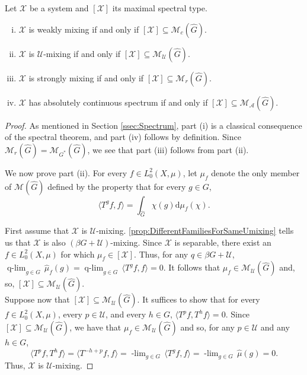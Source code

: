 \documentclass[graybox]{svmult}
\theoremstyle{definition}
\newcommand{\plimgG}[3]{\mathop {#1\text{-lim}}_{#2\in #3}\,}
\begin{document}
\begin{theorem}\label{thm:}
   Let $\mathcal{X}$ be a system and $[\mathcal{X}]$ its maximal spectral type.
    \begin{enumerate}[(i)]
        \item $\mathcal{X}$ is weakly mixing if and only if  $[\mathcal{X}] \subseteq \mathcal{M}_c(\widehat{G})$.

        \item $\mathcal{X}$ is $\mathcal{U}$-mixing if and only if  $[\mathcal{X}] \subseteq \mathcal{M}_\mathcal{U}(\widehat{G})$.

        \item $\mathcal{X}$ is strongly mixing if and only if  $[\mathcal{X}] \subseteq \mathcal{M}_r(\widehat{G})$.

        \item $\mathcal{X}$ has absolutely continuous spectrum if and only if  $[\mathcal{X}] \subseteq \mathcal{M}_\mathcal{A}(\widehat{G})$.
    \end{enumerate}
\end{theorem}
\begin{proof}
    As mentioned in Section \ref{ssec:Spectrum}, part (i) is a classical consequence of the spectral theorem, and part (iv) follows by definition.
    Since $\mathcal{M}_r(\widehat{G}) = \mathcal{M}_{G^*}(\widehat{G})$, we see that part (iii) follows from part (ii).

    We now prove part (ii). For every $f\in L_0^2(X,\mu)$, let $\mu_f$ denote the only member of $\mathcal M(\widehat G)$ defined by the property that for every $g\in G$, 
      $$
\langle T^g f,f\rangle =\int_{\widehat G}\chi(g)\text{d}\mu_f(\chi).
    $$
    
    First assume that $\mathcal X$ is $\mathcal U$-mixing. 
    \cref{prop:DifferentFamiliesForSameUmixing} tells us that $\mathcal{X}$ is also $(\beta G+\mathcal{U})$-mixing.
    Since $\mathcal X$ is separable, there exist an $f\in L_0^2(X,\mu)$ for which $\mu_f\in[\mathcal X]$. 
    Thus, for any $q\in \beta G+\mathcal U$, $\plimgG{q}{g}{G}\widehat\mu_f(g)=\plimgG{q}{g}{G} \langle T^g f,f\rangle=0$. 
    It follows that $\mu_f\in \mathcal M_{\mathcal U}(\widehat G)$ and, so, $[\mathcal X]\subseteq \mathcal M_{\mathcal U}(\widehat G)$.\\
    
    Suppose now that $[\mathcal X]\subseteq \mathcal M_\mathcal U(\widehat G)$. It suffices to show that for every $f\in L_0^2(X,\mu)$, every $p\in \mathcal U$, and every $h\in G$, $\langle T^pf, T^h f\rangle=0$. 
    Since $[\mathcal X]\subseteq \mathcal M_\mathcal U(\widehat G)$, we have that $\mu_f\in \mathcal M_\mathcal U(\widehat G)$ and so, for any $p\in \mathcal U$ and any $h\in G$,
    $$
\langle T^pf,T^{h}f\rangle=\langle T^{-h+p}f,f\rangle=\plimgG{(-h+p)}{g}{G}\langle T^gf,f\rangle=\plimgG{(-h+p)}{g}{G}\widehat\mu(g)=0.
    $$
    Thus, $\mathcal X$ is $\mathcal U$-mixing.
\end{proof}
\end{document}
